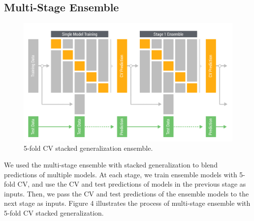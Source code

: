\subsection{Multi-Stage Ensemble}

\begin{figure}[!h]
  \centering
    \includegraphics[width=0.5 \textwidth]{cv_ensemble}
      \caption{5-fold CV stacked generalization ensemble.}
\end{figure}

We used the multi-stage ensemble with stacked generalization \cite{wolpert1992stacked, ting1999issues} to blend predictions of multiple models.  At each stage, we train ensemble models with 5-fold CV, and use the CV and test predictions of models in the previous stage as inputs.  Then, we pass the CV and test predictions of the ensemble models to the next stage as inputs.  Figure 4 illustrates the process of multi-stage ensemble with 5-fold CV stacked generalization.